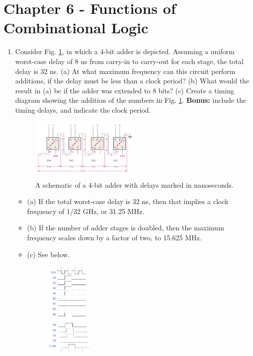 \documentclass[10pt]{article}
\begin{document}
\maketitle

\section{Chapter 6 - Functions of Combinational Logic}
\label{sec:comb2}

\begin{enumerate}
\item Consider Fig. \ref{fig:4bit_wDelay}, in which a 4-bit adder is depicted.  Assuming a uniform worst-case delay of 8 ns from carry-in to carry-out for each stage, the total delay is 32 ns.  (a) At what maximum frequency can this circuit perform additions, if the delay must be less than a clock period? (b) What would the result in (a) be if the adder was extended to 8 bits? (c) Create a timing diagram showing the addition of the numbers in Fig. \ref{fig:4bit_wDelay}. \textbf{Bonus:} include the timing delays, and indicate the clock period.
\begin{figure}[ht]
\centering
\includegraphics[width=0.5\textwidth]{figures/4bitadder_withDelay.pdf}
\caption{\label{fig:4bit_wDelay} A schematic of a 4-bit adder with delays marked in nanoseconds.}
\end{figure}
\begin{itemize}
\item (a) If the total worst-case delay is 32 ns, then that implies a clock frequency of 1/32 GHz, or 31.25 MHz.
\item (b) If the number of adder stages is doubled, then the maximum frequency scales down by a factor of two, to 15.625 MHz.
\item (c) See below.
\begin{figure}[hb]
\centering
\includegraphics[width=0.225\textwidth]{figures/timingExample16.pdf}

\end{figure}
\end{itemize}
\end{enumerate}
\end{document}
